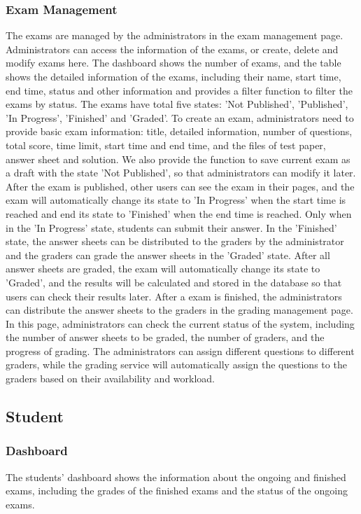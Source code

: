 \documentclass[12pt]{article}
\begin{document}
\subsubsection{Exam Management}
The exams are managed by the administrators in the exam management page. Administrators can access the information of the exams, or create, delete and modify exams here.
The dashboard shows the number of exams, and the table shows the detailed information of the exams, including their name, start time, end time, status and other information and
provides a filter function to filter the exams by status.
The exams have total five states: 'Not Published', 'Published', 'In Progress', 'Finished' and 'Graded'.
To create an exam, administrators need to provide basic exam information: title, detailed information, number of questions, total score,
time limit, start time and end time, and the files of test paper, answer sheet and solution. We also provide the function to save
current exam as a draft with the state 'Not Published', so that administrators can modify it later.
After the exam is published, other users can see the exam in their pages, and the exam will automatically change its state to 'In Progress' when the start time is reached and
end its state to 'Finished' when the end time is reached. Only when in the 'In Progress' state, students can submit their answer.
In the 'Finished' state, the answer sheets can be distributed to the graders by the administrator and the graders can grade the answer sheets in the 'Graded' state.
After all answer sheets are graded, the exam will automatically change its state to 'Graded', and the results will be calculated and stored in the database
so that users can check their results later.
After a exam is finished, the administrators can distribute the answer sheets to the graders in the grading management page.
In this page, administrators can check the current status of the system, including the number of answer sheets to be graded, the number of graders,
and the progress of grading. The administrators can assign different questions to different graders, while the grading service
will automatically assign the questions to the graders based on their availability and workload.
\subsection{Student}
\subsubsection{Dashboard}
The students' dashboard shows the information about the ongoing and finished exams, including the grades of the finished exams and the status of the ongoing exams.
\end{document}
